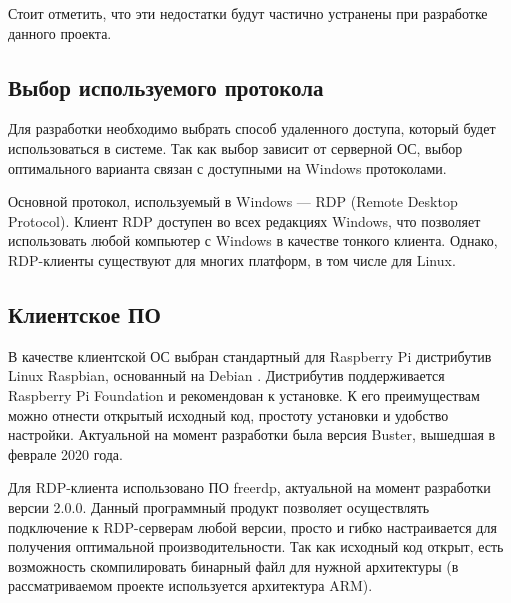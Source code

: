 Стоит отметить, что эти недостатки будут частично устранены при разработке данного
проекта.

\subsection{Выбор используемого протокола}

Для разработки необходимо выбрать способ удаленного доступа, который будет
использоваться в системе. Так как выбор зависит от серверной ОС, выбор оптимального
варианта связан с доступными на Windows протоколами.

Основной протокол, используемый в
Windows — RDP (Remote Desktop Protocol). Клиент RDP доступен во всех редакциях Windows,
что позволяет использовать любой компьютер с Windows в качестве тонкого клиента.
Однако, RDP-клиенты существуют для многих платформ, в том числе для Linux.

\subsection{Клиентское ПО}

В качестве клиентской ОС выбран стандартный для Raspberry Pi дистрибутив Linux Raspbian,
основанный на Debian \cite{ref:raspbian}.
Дистрибутив поддерживается Raspberry Pi Foundation и рекомендован к установке.
К его преимуществам можно отнести открытый исходный код, простоту установки и удобство 
настройки. 
Актуальной на момент разработки была версия Buster, вышедшая в феврале 2020 года.

Для RDP-клиента использовано ПО freerdp, актуальной на момент разработки версии
2.0.0. Данный программный продукт позволяет осуществлять подключение к RDP-серверам
любой версии, просто и гибко настраивается для получения оптимальной производительности.
Так как исходный код открыт, есть возможность скомпилировать бинарный файл для нужной
архитектуры (в рассматриваемом проекте используется архитектура ARM).
